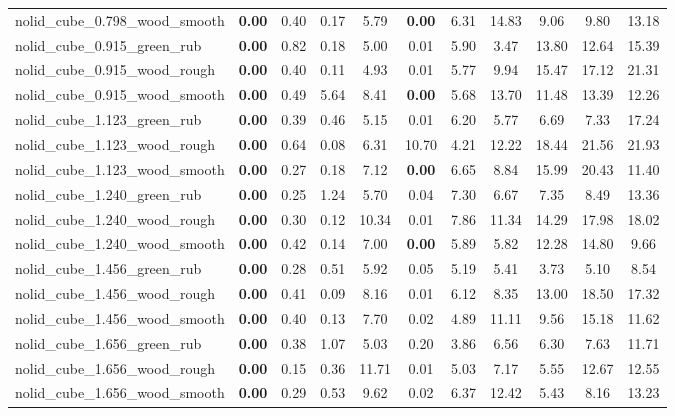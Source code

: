\begin{table}[H]
{\begin{tabular}{l cccccccccc}
        nolid\_cube\_0.798\_wood\_smooth & \textbf{0.00} & 0.40 & 0.17 & 5.79 & \textbf{0.00} & 6.31 & 14.83 & 9.06 & 9.80 & 13.18 \\
        nolid\_cube\_0.915\_green\_rub & \textbf{0.00} & 0.82 & 0.18 & 5.00 & 0.01 & 5.90 & 3.47 & 13.80 & 12.64 & 15.39 \\
        nolid\_cube\_0.915\_wood\_rough & \textbf{0.00} & 0.40 & 0.11 & 4.93 & 0.01 & 5.77 & 9.94 & 15.47 & 17.12 & 21.31 \\
        nolid\_cube\_0.915\_wood\_smooth & \textbf{0.00} & 0.49 & 5.64 & 8.41 & \textbf{0.00} & 5.68 & 13.70 & 11.48 & 13.39 & 12.26 \\
        nolid\_cube\_1.123\_green\_rub & \textbf{0.00} & 0.39 & 0.46 & 5.15 & 0.01 & 6.20 & 5.77 & 6.69 & 7.33 & 17.24 \\
        nolid\_cube\_1.123\_wood\_rough & \textbf{0.00} & 0.64 & 0.08 & 6.31 & 10.70 & 4.21 & 12.22 & 18.44 & 21.56 & 21.93 \\
        nolid\_cube\_1.123\_wood\_smooth & \textbf{0.00} & 0.27 & 0.18 & 7.12 & \textbf{0.00} & 6.65 & 8.84 & 15.99 & 20.43 & 11.40 \\
        nolid\_cube\_1.240\_green\_rub & \textbf{0.00} & 0.25 & 1.24 & 5.70 & 0.04 & 7.30 & 6.67 & 7.35 & 8.49 & 13.36 \\
        nolid\_cube\_1.240\_wood\_rough & \textbf{0.00} & 0.30 & 0.12 & 10.34 & 0.01 & 7.86 & 11.34 & 14.29 & 17.98 & 18.02 \\
        nolid\_cube\_1.240\_wood\_smooth & \textbf{0.00} & 0.42 & 0.14 & 7.00 & \textbf{0.00} & 5.89 & 5.82 & 12.28 & 14.80 & 9.66 \\
        nolid\_cube\_1.456\_green\_rub & \textbf{0.00} & 0.28 & 0.51 & 5.92 & 0.05 & 5.19 & 5.41 & 3.73 & 5.10 & 8.54 \\
        nolid\_cube\_1.456\_wood\_rough & \textbf{0.00} & 0.41 & 0.09 & 8.16 & 0.01 & 6.12 & 8.35 & 13.00 & 18.50 & 17.32 \\
        nolid\_cube\_1.456\_wood\_smooth & \textbf{0.00} & 0.40 & 0.13 & 7.70 & 0.02 & 4.89 & 11.11 & 9.56 & 15.18 & 11.62 \\
        nolid\_cube\_1.656\_green\_rub & \textbf{0.00} & 0.38 & 1.07 & 5.03 & 0.20 & 3.86 & 6.56 & 6.30 & 7.63 & 11.71 \\
        nolid\_cube\_1.656\_wood\_rough & \textbf{0.00} & 0.15 & 0.36 & 11.71 & 0.01 & 5.03 & 7.17 & 5.55 & 12.67 & 12.55 \\
        nolid\_cube\_1.656\_wood\_smooth & \textbf{0.00} & 0.29 & 0.53 & 9.62 & 0.02 & 6.37 & 12.42 & 5.43 & 8.16 & 13.23 \\

\end{tabular}}
\end{table}
